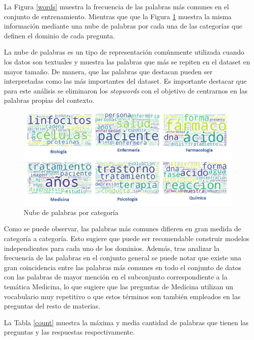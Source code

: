 La Figura \ref{words} muestra la frecuencia de las palabras más comunes en el conjunto de entrenamiento. Mientras que que la Figura \ref{category} muestra la misma información mediante una nube de palabras por cada una de las categorías que definen el dominio de cada pregunta. 

La nube de palabras es un tipo de representación comúnmente utilizada cuando los datos son textuales y muestra las palabras que más se repiten en el dataset en mayor tamaño. De manera, que las palabras que destacan pueden ser interpretadas como las más importantes del dataset. Es importante destacar que para este análisis se eliminaron los \textit{stopwords} con el objetivo de centrarnos en las palabras propias del contexto.

\begin{figure}[!tb]
  \begin{center}
    \includegraphics[angle=0, width=1\textwidth]{Graphics/word_category.png}
  \end{center}
    \caption{Nube de palabras por categoría}\label{category}
\end{figure}

Como se puede observar, las palabras más comunes difieren en gran medida de categoría a categoría. Esto sugiere que puede ser recomendable construir modelos independientes para cada uno de los dominios. Además, tras analizar la frecuencia de las palabras en el conjunto general se puede notar que existe una gran coincidencia entre las palabras más comunes en todo el conjunto de datos con las palabras de mayor mención en el subconjunto correspondiente a la temática Medicina, lo que sugiere que las preguntas de Medicina utilizan un vocabulario muy repetitivo o que estos términos son también empleados en las preguntas del resto de materias. 

La Tabla \ref{count} muestra la máxima y media cantidad de palabras que tienen las preguntas y las respuestas respectivamente.

